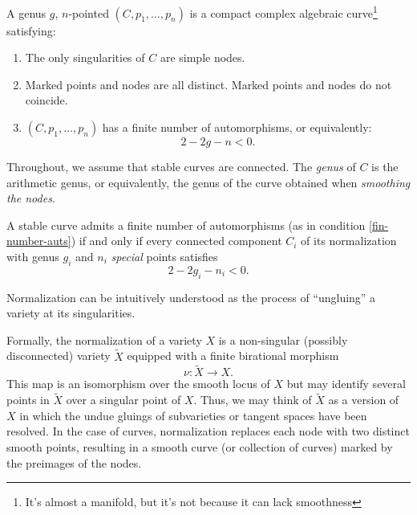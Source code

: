 \documentclass[12pt]{memoir}
\begin{document}
\begin{Def}
    A genus $g$, $n$-pointed  $(C,p_1,\dots,p_n)$ is a compact complex algebraic curve\footnote{It's almost a manifold, but it's not because it can lack smoothness} satisfying:
    \begin{enumerate}
        \item The only singularities of $C$ are simple nodes.
        \item Marked points and nodes are all distinct. Marked points and nodes do not coincide.
        \item\label{fin-number-auts} $(C,p_1,\dots,p_n)$ has a finite number of automorphisms, or equivalently:
        $$2-2g-n<0.$$
    \end{enumerate}
    Throughout, we assume that stable curves are connected. The \emph{genus} of $C$ is the arithmetic genus, or equivalently, the genus of the curve obtained when \emph{smoothing the nodes}.
\end{Def}

\begin{Th}
A stable curve admits a finite number of automorphisms (as in condition \ref{fin-number-auts}) if and only if every connected component $C_i$ of its normalization with genus $g_i$ and $n_i$ \emph{special} points satisfies 
$$2-2g_i-n_i<0.$$
\end{Th}

\begin{Rmk} 
Normalization can be intuitively understood as the process of ``ungluing'' a variety at its singularities.\par
Formally, the normalization of a variety $X$ is a non-singular (possibly disconnected) variety $\widetilde X$ equipped with a finite birational morphism 
$$\nu:\widetilde X\to X.$$
This map is an isomorphism over the smooth locus of $X$ but may identify several points in $\widetilde X$ over a singular point of $X$. Thus, we may think of $\widetilde X$ as a version of $X$ in which the undue gluings of subvarieties or tangent spaces have been resolved. In the case of curves, normalization replaces each node with two distinct smooth points, resulting in a smooth curve (or collection of curves) marked by the preimages of the nodes. 
\end{Rmk}
\end{document}
